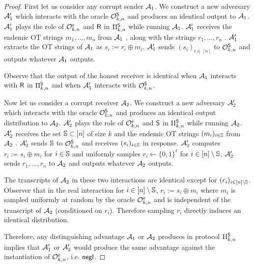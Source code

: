 \begin{proof}
	First let us consider any corrupt sender $\mathcal{A}_1$. We construct a new adversary $\mathcal{A}_1'$ which interacts with the oracle $\mathcal{O}^{\mathsf{S}}_{k,n}$ and produces an identical output  to $\mathcal{A}_1$.  $\mathcal{A}_1'$ plays the role of $\mathcal{O}^{e}_{k,n}$ and $\mathsf{R}$ in $\Pi^{\mathsf{S}}_{k,n}$ while running $\mathcal{A}_1$. $\mathcal{A}_1'$ receives the endemic OT strings $m_1,...,m_n$ from $\mathcal{A}_1$%
, along with the strings $r_1,...,r_n$%
.  $\mathcal{A}_1'$ extracts the OT strings of $\mathcal{A}_1$ as $s_i:=r_i\oplus m_i$. $\mathcal{A}_1'$ sends $(s_i)_{i\in [n]}$ to $\mathcal{O}^{\mathsf{S}}_{k,n}$ and outputs whatever $\mathcal{A}_1$ outputs.
	
	Observe that the output of the honest receiver is identical when $\mathcal{A}_1$ interacts with $\mathsf{R}$ in $\Pi^{\mathsf{S}}_{k,n}$ and when $\mathcal{A}_1'$ interacts with $\mathcal{O}^{\mathsf{S}}_{k,n}$.
	
	
	Now let us consider a corrupt receiver $\mathcal{A}_2$. We construct a new adversary $\mathcal{A}_2'$ which interacts with the oracle $\mathcal{O}^{\mathsf{S}}_{k,n}$ and produces an identical output distribution to $\mathcal{A}_2$. $\mathcal{A}_2'$ plays the role of $\mathcal{O}^{e}_{k,n}$ and $\mathsf{S}$ in $\Pi^{\mathsf{S}}_{k,n}$ while running $\mathcal{A}_2$. $\mathcal{A}_2'$ receives the set $\mathsf{\mathbb S}\subset[n]$ of size $k$ and the endemic OT strings $(m_i)_{i\in \mathsf{\mathbb S}}$ from $\mathcal{A}_2$%
. $\mathcal{A}_2'$ sends $\mathsf{\mathbb S}$ to  $\mathcal{O}^{\mathsf{S}}_{k,n}$ and receives $(s_i)_{i\in \mathsf{\mathbb S}}$ in response. $\mathcal{A}_2'$ computes $r_i:=s_i\oplus m_i$ for $i\in \mathsf{\mathbb S}$ and uniformly samples $r_i\gets \{0,1\}^\ell$ for $i\in [n]\setminus \mathsf{\mathbb S}$. $\mathcal{A}_2'$ sends $r_1,...,r_n$ to $\mathcal{A}_2$ and outputs whatever $\mathcal{A}_2$ outputs.

	The transcripts of $\mathcal{A}_2$ in these two interactions are identical except for $(r_i)_{i\in [n]\setminus \mathsf{\mathbb S}}$. Observer that in the real interaction for $i\in [n]\setminus\mathsf{\mathbb S}$, $r_i:=s_i\oplus m_i$ where $m_i$ is sampled uniformly at random  by the oracle $\mathcal{O}^{e}_{k,n}$ and is independent of the transcript of $\mathcal{A}_2$ (conditioned on $r_i$). Therefore sampling $r_i$ directly induces an identical distribution. 
	
	Therefore, any distinguishing advantage $\mathcal{A}_1$ or $\mathcal{A}_2$ produces in protocol $\Pi^{\mathsf{S}}_{k,n}$ implies that $\mathcal{A}_1'$ or $\mathcal{A}_2'$ would produce the same advantage against the instantiation of $\mathcal{O}^{e}_{k,n}$, i.e. $\mathsf{negl}$.
\end{proof}


